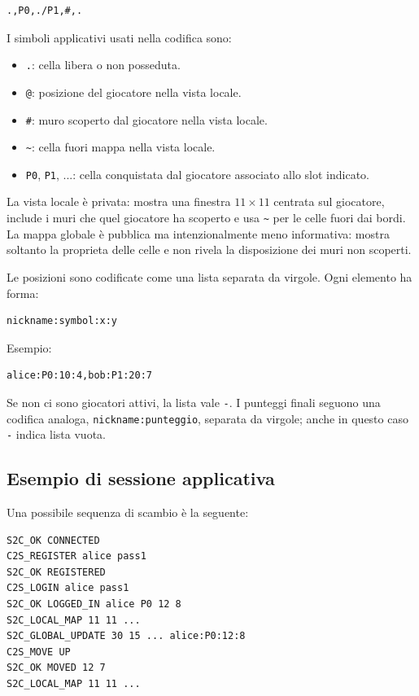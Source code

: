 \documentclass[11pt,a4paper]{article}
\begin{document}
\begin{lstlisting}[style=textstyle]
.,P0,./P1,#,.
\end{lstlisting}

I simboli applicativi usati nella codifica sono:

\begin{itemize}
  \item \texttt{.}: cella libera o non posseduta.
  \item \texttt{@}: posizione del giocatore nella vista locale.
  \item \texttt{\#}: muro scoperto dal giocatore nella vista locale.
  \item \texttt{\textasciitilde}: cella fuori mappa nella vista locale.
  \item \texttt{P0}, \texttt{P1}, ...: cella conquistata dal giocatore associato allo slot indicato.
\end{itemize}

La vista locale è privata: mostra una finestra \(11 \times 11\) centrata sul giocatore, include i muri che quel giocatore ha scoperto e usa \texttt{\textasciitilde} per le celle fuori dai bordi. La mappa globale è pubblica ma intenzionalmente meno informativa: mostra soltanto la proprieta delle celle e non rivela la disposizione dei muri non scoperti.

Le posizioni sono codificate come una lista separata da virgole. Ogni elemento ha forma:

\begin{lstlisting}[style=textstyle]
nickname:symbol:x:y
\end{lstlisting}

Esempio:

\begin{lstlisting}[style=textstyle]
alice:P0:10:4,bob:P1:20:7
\end{lstlisting}

Se non ci sono giocatori attivi, la lista vale \texttt{-}. I punteggi finali seguono una codifica analoga, \texttt{nickname:punteggio}, separata da virgole; anche in questo caso \texttt{-} indica lista vuota.

\subsection{Esempio di sessione applicativa}

Una possibile sequenza di scambio è la seguente:

\begin{lstlisting}[style=textstyle]
S2C_OK CONNECTED
C2S_REGISTER alice pass1
S2C_OK REGISTERED
C2S_LOGIN alice pass1
S2C_OK LOGGED_IN alice P0 12 8
S2C_LOCAL_MAP 11 11 ...
S2C_GLOBAL_UPDATE 30 15 ... alice:P0:12:8
C2S_MOVE UP
S2C_OK MOVED 12 7
S2C_LOCAL_MAP 11 11 ...
\end{lstlisting}
\end{document}
